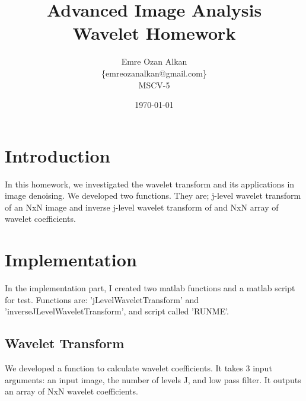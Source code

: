 \documentclass{article}
\title{Advanced Image Analysis\\
		Wavelet Homework}
\author{Emre Ozan Alkan\\
		\{emreozanalkan@gmail.com\}\\
		MSCV-5}
\date{\today}
\begin{document}
\maketitle

\section{Introduction}

In this homework, we investigated the wavelet transform and its applications in image denoising. We developed two functions. They are; j-level wavelet transform of an NxN image and inverse j-level wavelet transform of and NxN array of wavelet coefficients.

\section{Implementation}

In the implementation part, I created two matlab functions and a matlab script for test. Functions are: 'jLevelWaveletTransform' and 'inverseJLevelWaveletTransform', and script called 'RUNME'. 

\subsection{Wavelet Transform}

We developed a function to calculate wavelet coefficients. It takes 3 input arguments: an input image, the number of levels J, and low pass filter. It outputs an array of NxN wavelet coefficients. 
\end{document}

